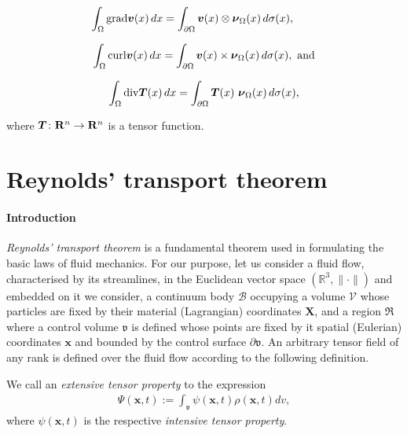 \begin{equation*}
\int_\Omega \mathrm{grad} \bv(x)\, dx =\int_{\partial \Omega}
\bv(x)\otimes \Bnu_\Omega(x) \, d\sigma(x),\ \phantom{\mathrm{and}}
\end{equation*}

\begin{equation*}
\int_\Omega \mathrm{curl} \mbox{\boldmath$ v$}(x)\, dx =\int_{\partial \Omega}
\mbox{\boldmath$ v$}(x)\times \mbox{\boldmath$\nu$}_\Omega(x) \, d\sigma(x),\ \mathrm{and}
\end{equation*}

\begin{equation*}
\int_\Omega \mathrm{div} \mbox{\boldmath$ T$}(x)\, dx =\int_{\partial \Omega}
\mbox{\boldmath$ T$}(x)\ \mbox{\boldmath$\nu$}_\Omega(x) \, d\sigma(x),
\end{equation*}

\noindent where $\mbox{\boldmath$ T$}\colon\mathbf R^n \to \mathbf R^n$ is a tensor function.

\section{Reynolds' transport theorem}
\label{reynolds-transport}

\paragraph{Introduction}
{\em Reynolds' transport theorem} \citep{Reynolds:1903} is a
fundamental theorem used in formulating the basic laws of fluid
mechanics. For our purpose, let us consider a fluid flow,
characterised by its streamlines, in the Euclidean vector space
$(\mathbb{R}^3,\lVert\cdot\rVert)$ and embedded on it we consider, a
continuum body $\mathscr{B}$ occupying a volume $\mathscr{V}$ whose
particles are fixed by their material (Lagrangian) coordinates
$\mathbf{X}$, and a region $\Re$ where a control volume $\mathfrak{v}$
is defined whose points are fixed by it spatial (Eulerian) coordinates
$\mathbf{x}$ and bounded by the control surface
$\partial\mathfrak{v}$. An arbitrary tensor field of any rank is
defined over the fluid flow according to the following definition.

\begin{definition*} We call an {\em extensive tensor property} to the expression
\begin{align}
\Psi(\mathbf{x},t):=
\int_{\mathfrak{v}}\psi(\mathbf{x},t)\rho(\mathbf{x},t)dv,
\label{extensive-property}
\end{align}
where $\psi(\mathbf{x},t)$ is the respective {\em intensive tensor
  property}.
\end{definition*}

